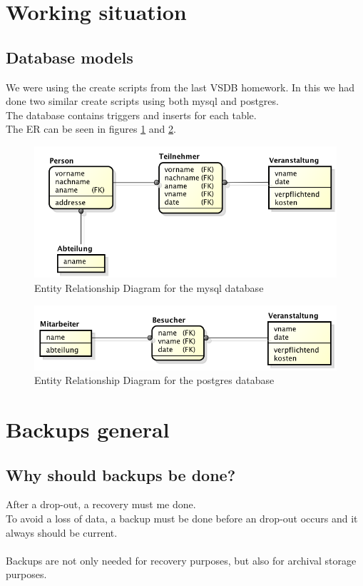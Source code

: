 \documentclass[10pt]{article}
\begin{document}
\section{Working situation}
\subsection{Database models}
We were using the create scripts from the last VSDB homework. In this we had done two similar create scripts using both mysql and postgres. \\ The database contains triggers and inserts for each table.\\ The ER can be seen in figures \ref{mysqler} and \ref{pger}.
\begin{figure}[!h]
	\begin{center}
		\includegraphics[width=0.8\linewidth]{pictures/ERD_mysql}
		\caption{Entity Relationship Diagram for the mysql database}
		\label{mysqler}
	\end{center}
\end{figure}
\begin{figure}[!h]
	\begin{center}
		\includegraphics[width=0.8\linewidth]{pictures/ERD_psql}
		\caption{Entity Relationship Diagram for the postgres database}
		\label{pger}
	\end{center}
\end{figure}
\FloatBarrier
\newpage
\newpage
\section{Backups general}
\subsection{Why should backups be done?}
After a drop-out, a recovery must me done. \\
To avoid a loss of data, a backup must be done before an drop-out occurs and it always should be current. \\ \\
Backups are not only needed for recovery purposes, but also for archival storage purposes.
\end{document}
